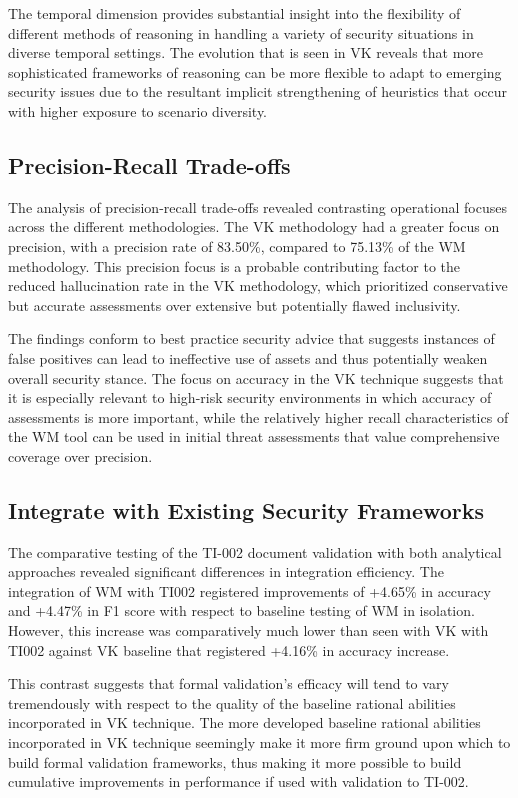 \documentclass[sigconf]{acmart}
\begin{document}
The temporal dimension provides substantial insight into the flexibility of different methods of reasoning in handling a variety of security situations in diverse temporal settings. The evolution that is seen in VK reveals that more sophisticated frameworks of reasoning can be more flexible to adapt to emerging security issues due to the resultant implicit strengthening of heuristics that occur with higher exposure to scenario diversity. 

\subsection{Precision-Recall Trade-offs}
The analysis of precision-recall trade-offs revealed contrasting operational focuses across the different methodologies. The VK methodology had a greater focus on precision, with a precision rate of 83.50\%, compared to 75.13\% of the WM methodology. This precision focus is a probable contributing factor to the reduced hallucination rate in the VK methodology, which prioritized conservative but accurate assessments over extensive but potentially flawed inclusivity.

The findings conform to best practice security advice that suggests instances of false positives can lead to ineffective use of assets and thus potentially weaken overall security stance. The focus on accuracy in the VK technique suggests that it is especially relevant to high-risk security environments in which accuracy of assessments is more important, while the relatively higher recall characteristics of the WM tool can be used in initial threat assessments that value comprehensive coverage over precision.

\subsection{Integrate with Existing Security Frameworks}
The comparative testing of the TI-002 document validation with both analytical approaches revealed significant differences in integration efficiency. The integration of WM with TI002 registered improvements of +4.65\% in accuracy and +4.47\% in F1 score with respect to baseline testing of WM in isolation. However, this increase was comparatively much lower than seen with VK with TI002 against VK baseline that registered +4.16\% in accuracy increase.

This contrast suggests that formal validation's efficacy will tend to vary tremendously with respect to the quality of the baseline rational abilities incorporated in VK technique. The more developed baseline rational abilities incorporated in VK technique seemingly make it more firm ground upon which to build formal validation frameworks, thus making it more possible to build cumulative improvements in performance if used with validation to TI-002.
\end{document}
